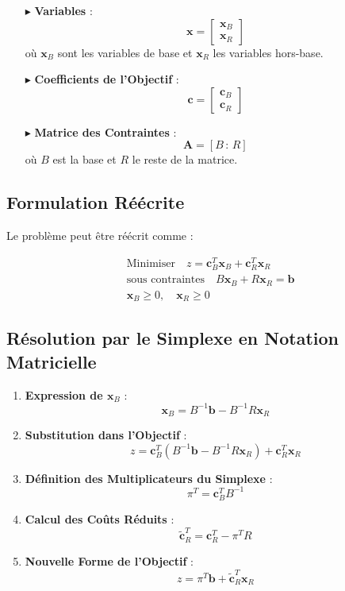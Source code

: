 \documentclass{report}
\begin{document}
\begin{multicols*}{2}
\begin{itemize}
    \item[$\blacktriangleright$] \textbf{Variables} :
    \[
    \mathbf{x} = 
    \begin{bmatrix}
    \mathbf{x}_B \\ \mathbf{x}_R
    \end{bmatrix}
    \]
    où \( \mathbf{x}_B \) sont les variables de base et \( \mathbf{x}_R \) les variables hors-base.
    \item[$\blacktriangleright$] \textbf{Coefficients de l'Objectif} :
    \[
    \mathbf{c} = 
    \begin{bmatrix}
    \mathbf{c}_B \\ \mathbf{c}_R
    \end{bmatrix}
    \]
    \item[$\blacktriangleright$] \textbf{Matrice des Contraintes} :
    \[
    \mathbf{A} = [ B \, : \, R ]
    \]
    où \( B \) est la base et \( R \) le reste de la matrice.
\end{itemize}

\subsection{Formulation Réécrite}

Le problème peut être réécrit comme :

\begin{align*}
& \text{Minimiser} \quad z = \mathbf{c}_B^T \mathbf{x}_B + \mathbf{c}_R^T \mathbf{x}_R \\
& \text{sous contraintes} \quad B \mathbf{x}_B + R \mathbf{x}_R = \mathbf{b} \\
& \mathbf{x}_B \geq 0, \quad \mathbf{x}_R \geq 0
\end{align*}

\subsection{Résolution par le Simplexe en Notation Matricielle}

\begin{enumerate}
    \item \textbf{Expression de \( \mathbf{x}_B \)} :
    \[
    \mathbf{x}_B = B^{-1} \mathbf{b} - B^{-1} R \mathbf{x}_R
    \]
    \item \textbf{Substitution dans l'Objectif} :
    \[
    z = \mathbf{c}_B^T ( B^{-1} \mathbf{b} - B^{-1} R \mathbf{x}_R ) + \mathbf{c}_R^T \mathbf{x}_R
    \]
    \item \textbf{Définition des Multiplicateurs du Simplexe} :
    \[
    \pi^T = \mathbf{c}_B^T B^{-1}
    \]
    \item \textbf{Calcul des Coûts Réduits} :
    \[
    \tilde{\mathbf{c}}_R^T = \mathbf{c}_R^T - \pi^T R
    \]
    \item \textbf{Nouvelle Forme de l'Objectif} :
    \[
    z = \pi^T \mathbf{b} + \tilde{\mathbf{c}}_R^T \mathbf{x}_R
    \]
\end{enumerate}


\end{multicols*}
\end{document}
